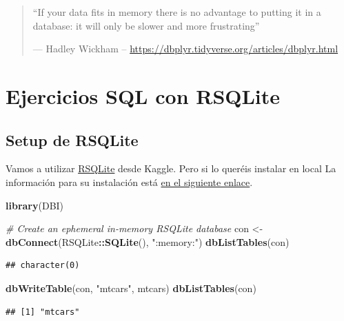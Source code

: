 \documentclass[
]{book}
\newenvironment{Shaded}{\begin{snugshade}}{\end{snugshade}}
\newcommand{\CommentTok}[1]{\textcolor[rgb]{0.56,0.35,0.01}{\textit{#1}}}
\newcommand{\FunctionTok}[1]{\textcolor[rgb]{0.13,0.29,0.53}{\textbf{#1}}}
\newcommand{\NormalTok}[1]{#1}
\newcommand{\OtherTok}[1]{\textcolor[rgb]{0.56,0.35,0.01}{#1}}
\newcommand{\SpecialCharTok}[1]{\textcolor[rgb]{0.81,0.36,0.00}{\textbf{#1}}}
\newcommand{\StringTok}[1]{\textcolor[rgb]{0.31,0.60,0.02}{#1}}
\begin{document}
\begin{quote}
``If your data fits in memory
there is no advantage to putting it in a database:
it will only be slower and more frustrating''

--- Hadley Wickham -- \url{https://dbplyr.tidyverse.org/articles/dbplyr.html}
\end{quote}

\hypertarget{ejercicios-sql-con-rsqlite}{%
\section{Ejercicios SQL con RSQLite}\label{ejercicios-sql-con-rsqlite}}

\hypertarget{setup-de-rsqlite}{%
\subsection{Setup de RSQLite}\label{setup-de-rsqlite}}

Vamos a utilizar \href{https://cran.r-project.org/web/packages/RSQLite/index.html}{RSQLite} desde Kaggle. Pero si lo queréis instalar en local La información para su instalación está \href{https://db.rstudio.com/databases/sqlite/}{en el siguiente enlace}.

\begin{Shaded}
\begin{Highlighting}[]
\FunctionTok{library}\NormalTok{(DBI)}

\CommentTok{\# Create an ephemeral in{-}memory RSQLite database}
\NormalTok{con }\OtherTok{\textless{}{-}} \FunctionTok{dbConnect}\NormalTok{(RSQLite}\SpecialCharTok{::}\FunctionTok{SQLite}\NormalTok{(), }\StringTok{":memory:"}\NormalTok{)}
\FunctionTok{dbListTables}\NormalTok{(con)}
\end{Highlighting}
\end{Shaded}

\begin{verbatim}
## character(0)
\end{verbatim}

\begin{Shaded}
\begin{Highlighting}[]
\FunctionTok{dbWriteTable}\NormalTok{(con, }\StringTok{"mtcars"}\NormalTok{, mtcars)}
\FunctionTok{dbListTables}\NormalTok{(con)}
\end{Highlighting}
\end{Shaded}

\begin{verbatim}
## [1] "mtcars"
\end{verbatim}
\end{document}
